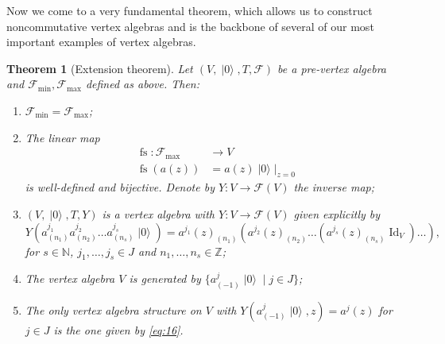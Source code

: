 \documentclass[a4paper, 12pt, reqno]{amsart}
\newtheorem{theorem}{Theorem}[section]
\theoremstyle{remark}
\numberwithin{equation}{subsection}
\DeclareMathOperator{\Id}{Id}
\DeclareMathOperator{\vac}{|0\rangle}
\DeclareMathOperator{\fs}{fs}
\begin{document}
Now we come to a very fundamental theorem, which allows us to construct noncommutative vertex algebras and is the backbone of several of our most important examples of vertex algebras.
\begin{theorem}[Extension theorem]
  \label{thr:20}
  Let $(V, \vac, T, \mathcal{F})$ be a pre-vertex algebra and $\mathcal{F}_{\min}, \mathcal{F}_{\max}$ defined as above.
  Then:
  \begin{enumerate}
  \item $\mathcal{F}_{\min} = \mathcal{F}_{\max}$;
  \item The linear map
    \begin{align*}
      \fs: \mathcal{F}_{\max} &\to V \\
      \fs(a(z)) &= a(z)\vac|_{z = 0}
    \end{align*}
    is well-defined and bijective.
    Denote by $Y: V \to \mathcal{F}(V)$ the inverse map;
  \item $(V, \vac, T, Y)$ is a vertex algebra with $Y: V \to \mathcal{F}(V)$ given explicitly by
    \begin{equation}
      \label{eq:16}
      Y(a^{j_1}_{(n_1)}a^{j_2}_{(n_2)}\dots a^{j_s}_{(n_s)}\vac) = a^{j_1}(z)_{(n_1)}(a^{j_2}(z)_{(n_2)}\dots (a^{j_s}(z)_{(n_s)}\Id_V)\dots),
    \end{equation}
    for $s \in \mathbb{N}$, $j_1, \dots, j_s \in J$ and $n_1, \dots, n_s \in \mathbb{Z}$;
  \item The vertex algebra $V$ is generated by $\{a^j_{(-1)}\vac \mid j \in J\}$;
  \item The only vertex algebra structure on $V$ with $Y(a^j_{(-1)}\vac, z) = a^j(z)$ for $j \in J$ is the one given by \eqref{eq:16}.
  \end{enumerate}
\end{theorem}
\end{document}
